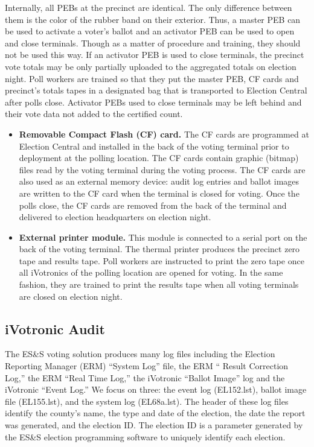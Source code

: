 Internally, all PEBs at the precinct are identical. The only
difference between them is the color of the rubber band on their
exterior. Thus, a master PEB can be used to activate a voter's ballot
and an activator PEB can be used to open and close terminals. Though
as a matter of procedure and training, they should not be used this
way. If an activator PEB is used to close terminals, the precinct vote
totals may be only partially uploaded to the aggregated totals on
election night. Poll workers are trained so that they put the master
PEB, CF cards and precinct's totals tapes in a designated bag that is
transported to Election Central after polls close.  Activator PEBs
used to close terminals may be left behind and their vote data not
added to the certified count.
\begin{itemize}
\item \textbf{Removable Compact Flash (CF) card.} The CF cards are
  programmed at Election Central and installed in the back of the
  voting terminal prior to deployment at the polling location. The CF
  cards contain graphic (bitmap) files read by the voting terminal
  during the voting process. The CF cards are also used as an external
  memory device: audit log entries and ballot images are written to
  the CF card when the terminal is closed for voting. Once the polls
  close, the CF cards are removed from the back of the terminal and
  delivered to election headquarters on election night.  

\item \textbf{External printer module.} This module is connected to a
  serial port on the back of the voting terminal. The thermal printer
  produces the precinct zero tape and results tape. Poll workers are
  instructed to print the zero tape once all iVotronics of the polling
  location are opened for voting. In the same fashion, they are
  trained to print the results tape when all voting terminals are
  closed on election night. 
\end{itemize}

\subsection{iVotronic Audit}
\smvertspace
The ES\&S voting solution produces many log files including the
Election Reporting Manager (ERM) \textquotedblleft System
Log\textquotedblright \hspace{1 mm} file, the ERM \textquotedblleft
Result Correction Log,\textquotedblright \hspace{1 mm} the ERM
\textquotedblleft Real Time Log,\textquotedblright \hspace{1 mm} the
iVotronic \textquotedblleft Ballot Image\textquotedblright \hspace{1
  mm} log and the iVotronic \textquotedblleft Event
Log.\textquotedblright \hspace{2 mm} We focus on three: the event log
(EL152.lst), ballot image file (EL155.lst), and the system log
(EL68a.lst).  The header of these log files identify the county's
name, the type and date of the election, the date the report was
generated, and the election ID. The election ID is a parameter
generated by the ES\&S election programming software to uniquely
identify each election.  
 

